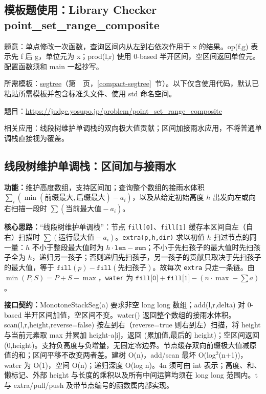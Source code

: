 \newpage



\Needspace{649pt}

\subsection*{模板题使用：Library Checker point\_set\_range\_composite}

\label{usage-example-78}

题意：单点修改一次函数，查询区间内从左到右依次作用于 x 的结果。op(f,g) 表示先 f 后 g，单位元为 x；prod(l,r) 使用 0-based 半开区间，空区间返回单位元。配置函数须和 main 一起抄写。

所需模板：\hyperref[compact-segtree]{segtree}（第~\pageref{compact-segtree}~页，\ref{compact-segtree}~节）。以下仅含使用代码，默认已粘贴所需模板并包含标准头文件、使用 std 命名空间。

题目：\url{https://judge.yosupo.jp/problem/point_set_range_composite}



\noindent 相关应用：线段树维护单调栈的双向极大值贡献；区间加接雨水应用，不将普通单调栈直接视为覆盖。

\subsection{线段树维护单调栈：区间加与接雨水}\label{compact-MonotoneStackSeg}

\noindent\textbf{功能：}\allowbreak 维护高度数组，支持区间加；查询整个数组的接雨水体积 $\sum_i(\min(\text{前缀最大},\text{后缀最大})-a_i)$，以及从给定初始高度 $h$ 出发向左或向右扫描一段时 $\sum(\text{当前最大值}-a_i)$。

\textbf{核心思路：}\allowbreak “线段树维护单调栈”：节点 \texttt{fill[0]}、\texttt{fill[1]} 缓存本区间自左（自右）扫描时 $\sum(\text{运行最大值}-a_i)$。\texttt{extra(p,h,dir)} 求以初值 $h$ 扫过节点的同一量：$h$ 不小于整段最大值时为 $h\cdot\texttt{len}-\texttt{sum}$；不小于先扫孩子的最大值时先扫孩子全为 $h$，递归另一孩子；否则递归先扫孩子，另一孩子的贡献只取决于先扫孩子的最大值，等于 $\texttt{fill}(p)-\texttt{fill}(\text{先扫孩子})$。故每次 \texttt{extra} 只走一条链。由 $\min(P,S)=P+S-\max$，\texttt{water} 为 $\texttt{fill[0]}+\texttt{fill[1]}-(n\cdot\max-\sum a)$。



{\sloppy{}\noindent\textbf{接口契约：}MonotoneStackSeg(a) 要求非空 long long 数组；add(l,r,delta) 对 0-based 半开区间加值，空区间不变。water() 返回整个数组的接雨水体积。scan(l,r,height,reverse=false) 按左到右（reverse=true 则右到左）扫描，将 height 与当前元素取 max 并累加 height-a[i]，返回 (累加值,最后的 height)；空区间返回 (0,height)。支持负高度与负增量，无固定零边界。节点缓存双向前缀极大值减原值的和；区间平移不改变两者差。建树 O(n)，add/scan 最坏 O(log$^{2}$(n+1))，water 为 O(1)，空间 O(n)；递归深度 O(log n)。4n 须可由 int 表示；高度、和、懒标记、外部 height 与长度的乘积以及所有中间运算均须在 long long 范围内。t 与 extra/pull/push 及带节点编号的函数属内部实现。\par}


